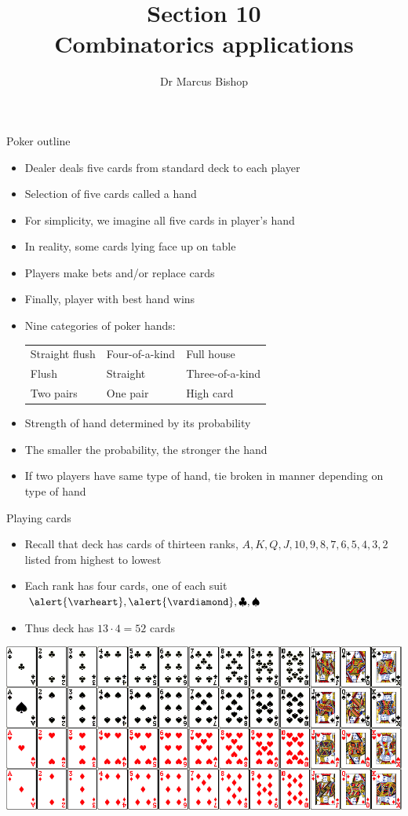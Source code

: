 \documentclass[handout,xcolor=dvipsnames]{beamer}
\title[\S10]{Section 10\\Combinatorics applications}
\author{Dr Marcus Bishop}
\theoremstyle{definition}
\newcommand{\hs}{\alert{\varheart}}
\newcommand{\ds}{\alert{\vardiamond}}
\newcommand{\s}{\spadesuit}
\newcommand{\cs}{\clubsuit}
\begin{document}
\begin{frame}\titlepage\end{frame}
\LogoOff

\begin{frame}{Poker outline}
\begin{itemize}
\item Dealer deals five cards from standard deck
to each player
\item Selection of five cards called a \alert{hand}
\item For simplicity, we imagine all five cards in player's hand
\item In reality, some cards lying face up on table
\item Players make bets and/or replace cards
\item Finally, player with \alert{best hand} wins
\item Nine categories of poker hands:
\begin{tabular}{lll}
Straight flush&Four-of-a-kind&Full house\\
Flush&Straight&Three-of-a-kind\\
Two pairs&One pair&High card
\end{tabular}
\item Strength of hand determined by its probability
\item The smaller the probability, the stronger the hand
\item If two players have same type of hand, tie
broken in manner depending on type of hand
\end{itemize}
\end{frame}

\begin{frame}{Playing cards}
\begin{itemize}
\item Recall that deck has cards of thirteen \alert{ranks},
$A,K,Q,J,10,9,8,7,6,5,4,3,2$
listed from highest to lowest
\item Each rank has four cards, one of each \alert{suit} $\hs,\ds,\cs,\s$
\item Thus deck has $13\cdot 4=52$ cards
\end{itemize}
\includegraphics[scale=.3]{cards}
\end{frame}
\end{document}
